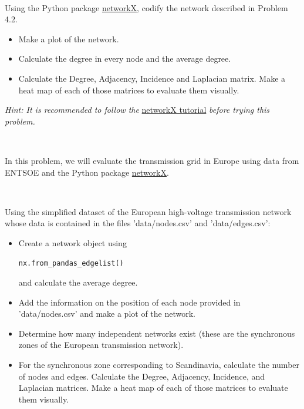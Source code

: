 \documentclass[10pt]{article}
\newenvironment{problem}[2][Problem]{\begin{trivlist}
\item[\hskip \labelsep {\bfseries #1}\hskip \labelsep {\bfseries #2.}]}{\end{trivlist}}
\begin{document}
\

\begin{problem}{4.3}
Using the Python package \href{https://networkx.org/}{networkX}, codify the network described in Problem 4.2. 

\begin{itemize}
\item[a)] Make a plot of the network.
\item[b)] Calculate the degree in every node and the average degree.
\item[c)] Calculate the Degree, Adjacency, Incidence and Laplacian matrix. Make a heat map of each of those matrices to evaluate them visually.

\end{itemize}

\textit{Hint: It is recommended to follow the} \href{https://martavp.github.io/integrated-energy-grids/intro-networkx.html#}{networkX tutorial} \textit{before trying this problem.}
\end{problem}

\

\begin{problem}{4.4}

In this problem, we will evaluate the transmission grid in Europe using data from ENTSOE and the Python package \href{https://networkx.org/}{networkX}.

\

Using the simplified dataset of the European high-voltage transmission network whose data is contained in the files 'data/nodes.csv' and 'data/edges.csv':

\begin{itemize}
\item[a)] Create a network object using 
 
\begin{verbatim}
nx.from_pandas_edgelist()
\end{verbatim}

and calculate the average degree.

\item[b)]  Add the information on the position of each node provided in 'data/nodes.csv' and make a plot of the network.

\item[c)]  Determine how many independent networks exist (these are the synchronous zones of the European transmission network).

\item[d)]  For the synchronous zone corresponding to Scandinavia, calculate the number of nodes and edges. Calculate the Degree, Adjacency, Incidence, and Laplacian matrices. Make a heat map of each of those matrices to evaluate them visually.

\end{itemize}

\end{problem}

\end{document}
